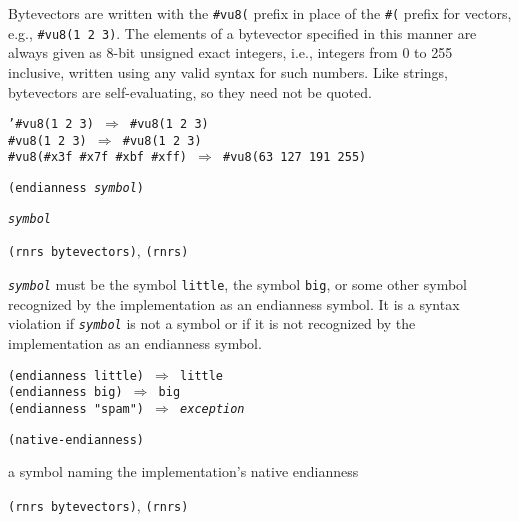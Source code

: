 Bytevectors are written with the \texttt{\#{}vu8(} prefix in place of the
\texttt{\#{}(} prefix for vectors, e.g., \texttt{\#{}vu8(1 2 3)}.
The elements of a bytevector specified in this manner are always given as
8-bit unsigned exact integers, i.e., integers from 0 to 255 inclusive,
written using any valid syntax for such numbers.
Like strings, bytevectors are self-evaluating, so they need not be
quoted.


\begin{alltt}
'\#{}vu8(1 2 3) \(\Rightarrow\) \#{}vu8(1 2 3)
\#{}vu8(1 2 3) \(\Rightarrow\) \#{}vu8(1 2 3)
\#{}vu8(\#{}x3f \#{}x7f \#{}xbf \#{}xff) \(\Rightarrow\) \#{}vu8(63 127 191 255)
\end{alltt}

\begin{description}

\label{objects_s240}\item[syntax] \texttt{(endianness \textit{symbol})}



\item[returns] \texttt{\textit{symbol}}


\item[libraries] \texttt{(rnrs bytevectors)}, \texttt{(rnrs)}
\end{description}

\texttt{\textit{symbol}} must be the symbol \texttt{little}, the symbol \texttt{big},
or some other symbol recognized by the implementation as an endianness
symbol.
It is a syntax violation if \texttt{\textit{symbol}} is not a symbol or if it is not
recognized by the implementation as an endianness symbol.

\begin{alltt}
(endianness little) \(\Rightarrow\) little
(endianness big) \(\Rightarrow\) big
(endianness "spam") \(\Rightarrow\) \textit{exception}
\end{alltt}

\begin{description}

\label{objects_s241}\item[procedure] \texttt{(native-endianness)}



\item[returns] a symbol naming the implementation's native endianness


\item[libraries] \texttt{(rnrs bytevectors)}, \texttt{(rnrs)}
\end{description}


